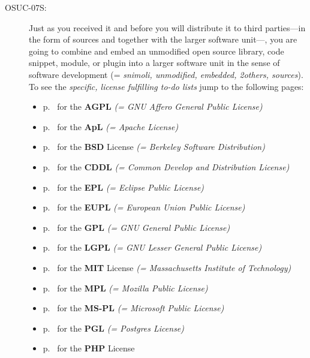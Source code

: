 \begin{description}
\item[OSUC-07S:]\label{OSUC-07S-DEF} Just as you received it and before you will
distribute it to third parties---in the form of sources and together with the
larger software unit---, you are going to combine and embed an unmodified open
source library, code snippet, module, or plugin into a larger software unit in
the sense of software development (= \textit{snimoli, unmodified, embedded,
2others, sources}). To see the \textit{specific, license fulfilling to-do lists}
jump to the following pages:
   \begin{itemize}
    \item p.\ \pageref{OSUC-07S-AGPL} for the \textbf{AGPL}
      \textit{(= GNU Affero General Public License)} 
    \item p.\ \pageref{OSUC-07S-Apache20} for the \textbf{ApL}
      \textit{(= Apache License)}
    \item p.\ \pageref{OSUC-07S-BSD} for the \textbf{BSD} License
      \textit{(= Berkeley Software Distribution)}
    \item p.\ \pageref{OSUC-07S-CDDL} for the \textbf{CDDL}
      \textit{(= Common Develop and Distribution License)}  
    \item p.\ \pageref{OSUC-07S-EPL} for the \textbf{EPL}
      \textit{(= Eclipse Public License)}     
    \item p.\ \pageref{OSUC-07S-EUPL} for the \textbf{EUPL}
      \textit{(= European Union Public License)} 
    \item p.\ \pageref{OSUC-07S-GPL} for the \textbf{GPL}
       \textit{(= GNU General Public License)} 
    \item p.\ \pageref{OSUC-07S-LGPL} for the \textbf{LGPL}
      \textit{(= GNU Lesser General Public License)}           
    \item p.\ \pageref{OSUC-07S-MIT} for the \textbf{MIT} License
       \textit{(= Massachusetts Institute of Technology)} 
    \item p.\ \pageref{OSUC-07S-MPL} for the \textbf{MPL}
      \textit{(= Mozilla Public License)}     
    \item p.\ \pageref{OSUC-07S-MS-PL} for the \textbf{MS-PL}
      \textit{(= Microsoft Public License)} 
    \item p.\ \pageref{OSUC-07S-PGL} for the \textbf{PGL}
      \textit{(= Postgres License)} 
    \item p.\ \pageref{OSUC-07S-PHP} for the \textbf{PHP} License 
  \end{itemize}


\end{description}
